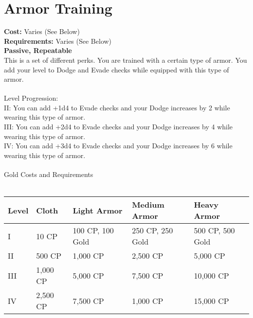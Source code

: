 \section{Armor Training}\label{perk:armorTraining}
\textbf{Cost:} Varies (See Below)\\
\textbf{Requirements:} Varies (See Below)\\
\textbf{Passive, Repeatable}\\
This is a set of different perks.
You are trained with a certain type of armor.
You add your level to Dodge and Evade checks while equipped with this type of armor.\\
\\
Level Progression:\\
II: You can add +1d4 to Evade checks and your Dodge increases by 2 while wearing this type of armor.\\
III: You can add +2d4 to Evade checks and your Dodge increases by 4 while wearing this type of armor.\\
IV: You can add +3d4 to Evade checks and your Dodge increases by 6 while wearing this type of armor.\\
\\
Gold Costs and Requirements\\
\\
\begin{tabular}{l | p{2cm} | p{2.4cm} | p{2.6cm} | p{2.6cm}}
	Level & Cloth & Light Armor & Medium Armor & Heavy Armor\\ \hline
	I & 10 CP & 100 CP, 100 Gold & 250 CP, 250 Gold & 500 CP, 500 Gold\\
	II & 500 CP & 1,000 CP & 2,500 CP & 5,000 CP\\
	III & 1,000 CP& 5,000 CP & 7,500 CP & 10,000 CP\\
	IV & 2,500 CP& 7,500 CP & 1,000 CP & 15,000 CP\\
\end{tabular}